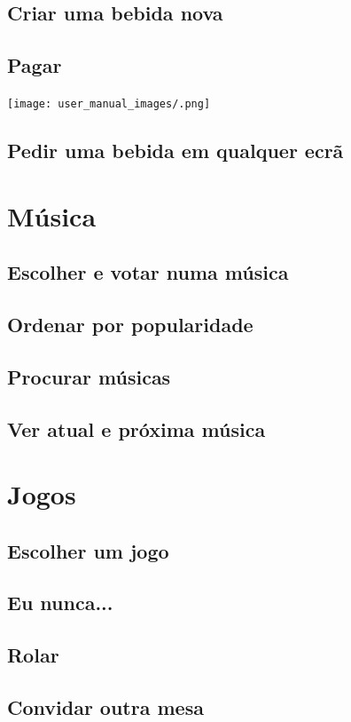 \documentclass{article}
\begin{document}
\subsection{Criar uma bebida nova}
\subsection{Pagar}
\texttt{[image: user\_manual\_images/.png]}
\subsection{Pedir uma bebida em qualquer ecrã}
\section{Música}
\subsection{Escolher e votar numa música}
\subsection{Ordenar por popularidade}
\subsection{Procurar músicas}
\subsection{Ver atual e próxima música}
\section{Jogos}
\subsection{Escolher um jogo}
\subsection{Eu nunca...}
\subsection{Rolar}
\subsection{Convidar outra mesa}
\end{document}
